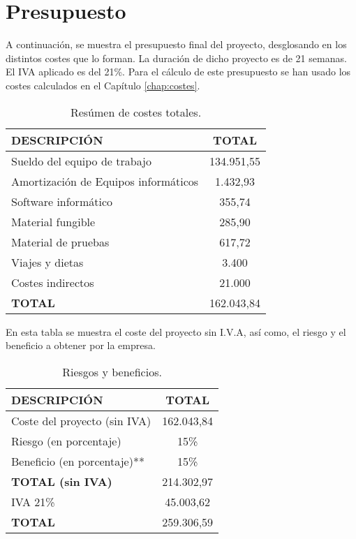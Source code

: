 \section{Presupuesto}

\par A continuación, se muestra el presupuesto final del proyecto, desglosando en los distintos costes que lo forman. La duración de dicho proyecto es de 21 semanas. El IVA aplicado es del 21\%. Para el cálculo de este presupuesto se han usado los costes calculados en el Capítulo \ref{chap:costes}.



\begin{table}[H]
\begin{center}
\begin{tabular}{l c}
\textbf{DESCRIPCIÓN} & \textbf{TOTAL}\\ \hline \hline
Sueldo del equipo de trabajo & 134.951,55\\
Amortización de Equipos informáticos & 1.432,93\\
Software informático & 355,74\\
Material fungible & 285,90\\
Material de pruebas & 617,72\\
Viajes y dietas & 3.400\\
Costes indirectos & 21.000\\ \hline \hline
\textbf{TOTAL} & 162.043,84\\ \hline
\end{tabular}
\caption{Resúmen de costes totales.}
\label{tab:resumenTotal}
\end{center}
\end{table}

En esta tabla se muestra el coste del proyecto sin I.V.A, así como, el riesgo y el beneficio a obtener por la empresa.
\begin{table}[H]
\begin{center}
\begin{tabular}{l c}
\textbf{DESCRIPCIÓN} & \textbf{TOTAL}\\ \hline \hline
Coste del proyecto (sin IVA) &  162.043,84\\
Riesgo (en porcentaje) & 15\% \\
Beneficio (en porcentaje)** & 15\% \\ \hline \hline
\textbf{TOTAL (sin IVA)} & 214.302,97\\ \hline \hline
IVA 21\% & 45.003,62 \\\hline \hline
\textbf{TOTAL} & 259.306,59\\ \hline
\end{tabular}
\caption{Riesgos y beneficios.}
\label{tab:total}
\end{center}
\end{table}




